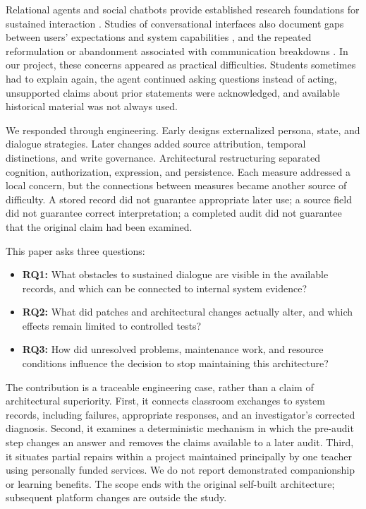 \documentclass[11pt,a4paper]{article}
\begin{document}
Relational agents and social chatbots provide established research foundations for sustained interaction \cite{bickmore,xiaoice}. Studies of conversational interfaces also document gaps between users' expectations and system capabilities \cite{luger}, and the repeated reformulation or abandonment associated with communication breakdowns \cite{mavrina}. In our project, these concerns appeared as practical difficulties. Students sometimes had to explain again, the agent continued asking questions instead of acting, unsupported claims about prior statements were acknowledged, and available historical material was not always used.

We responded through engineering. Early designs externalized persona, state, and dialogue strategies. Later changes added source attribution, temporal distinctions, and write governance. Architectural restructuring separated cognition, authorization, expression, and persistence. Each measure addressed a local concern, but the connections between measures became another source of difficulty. A stored record did not guarantee appropriate later use; a source field did not guarantee correct interpretation; a completed audit did not guarantee that the original claim had been examined.

This paper asks three questions:
\begin{itemize}
\item \textbf{RQ1:} What obstacles to sustained dialogue are visible in the available records, and which can be connected to internal system evidence?
\item \textbf{RQ2:} What did patches and architectural changes actually alter, and which effects remain limited to controlled tests?
\item \textbf{RQ3:} How did unresolved problems, maintenance work, and resource conditions influence the decision to stop maintaining this architecture?
\end{itemize}

The contribution is a traceable engineering case, rather than a claim of architectural superiority. First, it connects classroom exchanges to system records, including failures, appropriate responses, and an investigator's corrected diagnosis. Second, it examines a deterministic mechanism in which the pre-audit step changes an answer and removes the claims available to a later audit. Third, it situates partial repairs within a project maintained principally by one teacher using personally funded services. We do not report demonstrated companionship or learning benefits. The scope ends with the original self-built architecture; subsequent platform changes are outside the study.
\end{document}
